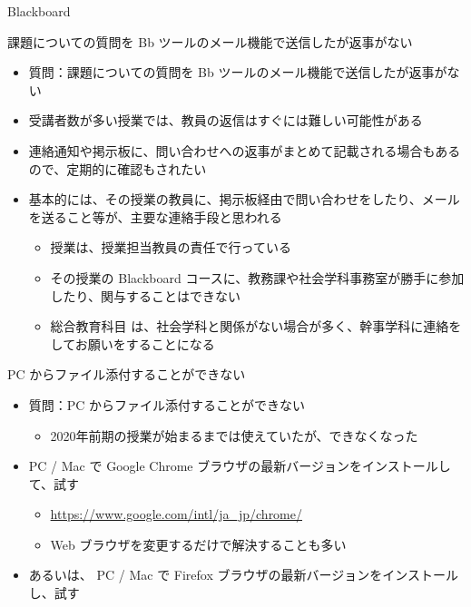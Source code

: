 \documentclass[a4j,10pt]{jsarticle}
\begin{document}
{\newpage\clearpage
{}%
\begin{frame}[label={sec:orgc119bb0},fragile]{Blackboard}
 \begin{block}{課題についての質問を Bb ツールのメール機能で送信したが返事がない}
\begin{itemize}
\item 質問：課題についての質問を Bb ツールのメール機能で送信したが返事がない
\par
\item 受講者数が多い授業では、教員の返信はすぐには難しい可能性がある
\item 連絡通知や掲示板に、問い合わせへの返事がまとめて記載される場合もあるので、定期的に確認もされたい
\item 基本的には、その授業の教員に、掲示板経由で問い合わせをしたり、メールを送ること等が、主要な連絡手段と思われる
\begin{itemize}
\item 授業は、授業担当教員の責任で行っている
\item その授業の Blackboard コースに、教務課や社会学科事務室が勝手に参加したり、関与することはできない
\item 総合教育科目 は、社会学科と関係がない場合が多く、幹事学科に連絡をしてお願いをすることになる
\end{itemize}
\end{itemize}
\end{block}
\par
\begin{block}{PC からファイル添付することができない}
\begin{itemize}
\item 質問：PC からファイル添付することができない
\begin{itemize}
\item 2020年前期の授業が始まるまでは使えていたが、できなくなった
\end{itemize}
\par
\item PC / Mac で Google Chrome ブラウザの最新バージョンをインストールして、試す
\begin{itemize}
\item \url{https://www.google.com/intl/ja\_jp/chrome/}
\item Web ブラウザを変更するだけで解決することも多い
\end{itemize}
\par
\item あるいは、 PC / Mac で Firefox ブラウザの最新バージョンをインストールし、試す

\end{itemize}
\end{block}
\end{frame}}
\end{document}
